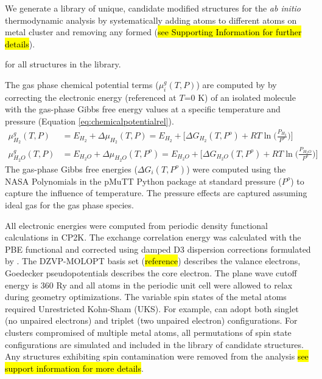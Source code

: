 \documentclass[journal=jctcce,manuscript=article]{achemso}
\begin{document}
We generate a library of unique, candidate modified structures for the \textit{ab initio} thermodynamic analysis by systematically adding  atoms to different atoms on metal cluster and removing any formed  (\hl{see Supporting Information for further details}).




for all structures in the library.

The gas phase chemical potential terms ($\mu_{i}^{g}(T,P)$) are computed by by correcting the electronic energy (referenced at $T$=0 K) of an isolated molecule with the gas-phase Gibbs free energy values at a specific temperature and pressure (Equation \ref{eq:chemicalpotentialrel}).
\begin{equation}
    \begin{split}
        \mu_{H_{2}}^{g}(T,P) &= E_{H_2} + \Delta \mu_{H_{2}}(T,P)  = E_{H_{2}} + \Big[ \Delta G_{H_{2}}(T,P^{o}) + RT \ln{\Big( \frac{P_{H_{2}}}{P^{o}} \Big)} \Big] \\  
        \mu_{H_{2}O}^{g}(T,P) &= E_{H_{2}O} + \Delta \mu_{H_{2}O}(T,P^{o}) =  E_{H_{2}O} + \Big[ \Delta G_{H_{2}O}(T,P^{o}) + RT \ln{\Big( \frac{P_{H_{2}O}}{P^{o}} \Big)} \Big]
    \end{split}
    \label{eq:chemicalpotentialrel}
\end{equation}
 The gas-phase Gibbs free energies ($\Delta G_{i}(T,P^{o})$) were computed using the NASA Polynomials\cite{Mcbride1993} in the pMuTT\cite{LYM2019106864} Python package at standard pressure ($P^{o}$) to capture the influence of temperature. The pressure effects are captured assuming ideal gas for the gas phase species. 
 
All electronic energies were computed from periodic density functional calculations in CP2K.\cite{Hutter2014} The exchange correlation energy was calculated with the PBE functional\cite{Perdew1996} and corrected using damped D3 dispersion corrections formulated by \citeauthor{Grimme2010}.\cite{Grimme2010} The DZVP-MOLOPT basis set (\hl{reference}) describes the valance electrons, Goedecker pseudopotentials\cite{Goedecker1996} describes the core electron. The plane wave cutoff energy is 360 Ry and  all atoms in the periodic unit cell were allowed to relax during geometry optimizations. The variable spin states of the metal atoms required Unrestricted Kohn-Sham (UKS). For example,  can adopt both singlet (no unpaired electrons) and triplet (two unpaired electron) configurations. For clusters compromised of multiple metal atoms, all permutations of spin state configurations are simulated and included in the library of candidate structures. Any structures exhibiting spin contamination were removed from the analysis \hl{see support information for more details}.
\end{document}
